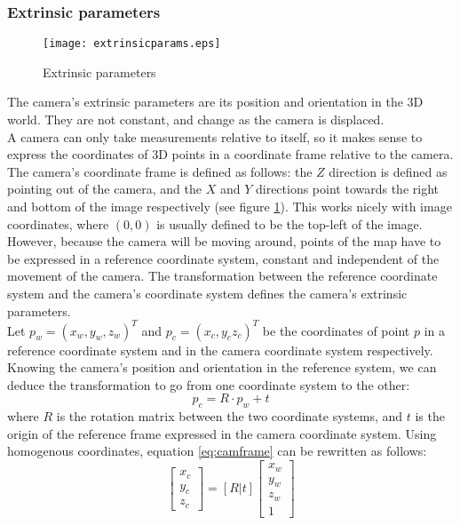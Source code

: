 \subsubsection{Extrinsic parameters}

\begin{figure}[H]
  \centering
  \texttt{[image: extrinsicparams.eps]}
  \caption{Extrinsic parameters}
  \label{fig:pincam_ext}
\end{figure}

The camera's extrinsic parameters are its position and orientation in the 3D world. They are not constant, and change as the camera is displaced.\\

A camera can only take measurements relative to itself, so it makes sense to express the coordinates of 3D points in a coordinate frame relative to the camera. The camera's coordinate frame is defined as follows: the $Z$ direction is defined as pointing out of the camera, and the $X$ and $Y$ directions point towards the right and bottom of the image respectively (see figure \ref{fig:pincam_ext}). This works nicely with image coordinates, where $(0,0)$ is usually defined to be the top-left of the image.\\

However, because the camera will be moving around, points of the map have to be expressed in a reference coordinate system, constant and independent of the movement of the camera. The transformation between the reference coordinate system and the camera's coordinate system defines the camera's extrinsic parameters.\\

Let $p_w = (x_w, y_w, z_w)^T$ and $p_c = (x_c, y_c z_c)^T$ be the coordinates of point $p$ in a reference coordinate system and in the camera coordinate system respectively. Knowing the camera's position and orientation in the reference system, we can deduce the transformation to go from one coordinate system to the other:
\begin{equation}\label{eq:camframe}
  p_c = R \cdot p_w + t
\end{equation}
where $R$ is the rotation matrix between the two coordinate systems, and $t$ is the origin of the reference frame expressed in the camera coordinate system. Using homogenous coordinates, equation \ref{eq:camframe} can be rewritten as follows:
\begin{equation}\label{eq:camframe_bis}
  \begin{bmatrix}
     x_c \\
     y_c \\
     z_c
   \end{bmatrix}
     = [R|t]
   \begin{bmatrix}
      x_w \\
      y_w \\
      z_w \\
      1
   \end{bmatrix}
\end{equation}

